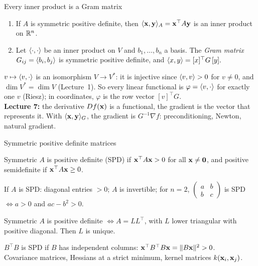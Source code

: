 \documentclass[aspectratio=1610,11pt]{beamer}
\begin{document}
\begin{frame}{Every inner product is a Gram matrix}
    \begin{theorem}
        \small
        \begin{enumerate}
            \item If $A$ is symmetric positive definite, then $\langle \mathbf{x}, \mathbf{y} \rangle_A = \mathbf{x}^\top A \mathbf{y}$ is an inner product on $\mathbb{R}^n$.
            \item Let $\langle \cdot, \cdot \rangle$ be an inner product on $V$ and $b_1, \ldots, b_n$ a basis. The \emph{Gram matrix} $G_{ij} = \langle b_i, b_j \rangle$ is symmetric positive definite, and
            \(\langle x, y \rangle = [x]^\top G\, [y].\)
        \end{enumerate}
    \end{theorem}
    \begin{remark}
        \small
        $v \mapsto \langle v, \cdot \rangle$ is an isomorphism $V \to V^*$: it is injective since $\langle v, v \rangle > 0$ for $v \neq 0$, and $\dim V^* = \dim V$ (Lecture~1). So every linear functional is $\varphi = \langle v, \cdot \rangle$ for exactly one $v$ (Riesz); in coordinates, $\varphi$ is the row vector $[v]^\top G$.
        \\[0.3em]
        \textbf{Lecture 7:} the derivative $Df(\mathbf{x})$ is a functional, the gradient is the vector that represents it. With $\langle \mathbf{x}, \mathbf{y} \rangle_G$, the gradient is $G^{-1}\nabla f$: preconditioning, Newton, natural gradient.
    \end{remark}
\end{frame}

\begin{frame}{Symmetric positive definite matrices}
    \begin{definition}
        \small Symmetric $A$ is positive definite (SPD) if $\mathbf{x}^\top A\mathbf{x} > 0$ for all $\mathbf{x} \neq \mathbf{0}$, and positive semidefinite if $\mathbf{x}^\top A\mathbf{x} \geq 0$.
    \end{definition}
    \begin{proposition}
        \small If $A$ is SPD: diagonal entries $> 0$; $A$ is invertible; for $n = 2$, $\begin{pmatrix} a & b \\ b & c\end{pmatrix}$ is SPD $\iff a > 0$ and $ac - b^2 > 0$.
    \end{proposition}
    \begin{theorem}
        \small Symmetric $A$ is positive definite $\iff A = LL^\top$, with $L$ lower triangular with positive diagonal. Then $L$ is unique.
    \end{theorem}
    \small $B^\top B$ is SPD if $B$ has independent columns: $\mathbf{x}^\top B^\top B\mathbf{x} = \lVert B\mathbf{x} \rVert^2 > 0$. \\
    \textcolor{mlcolor}{Covariance matrices, Hessians at a strict minimum, kernel matrices $k(\mathbf{x}_i, \mathbf{x}_j)$.}
\end{frame}
\end{document}
